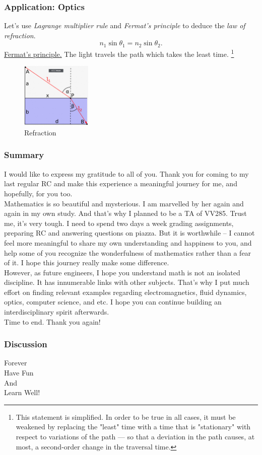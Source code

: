 \documentclass[11pt, t]{beamer}
\begin{document}
\begin{frame}
    \frametitle{Application: Optics}
    Let's use \textit{Lagrange multiplier rule} and \textit{Fermat's principle} to deduce the \textit{law of refraction}.
    $$n_1\sin\theta_1=n_2\sin\theta_2.$$
    \href{https://en.wikipedia.org/wiki/Fermat\%27s_principle}{Fermat's principle.} The light travels the path which takes the least time. \footnote[frame]{This statement is simplified. In order to be true in all cases, it must be weakened by replacing the "least" time with a time that is "stationary" with respect to variations of the path — so that a deviation in the path causes, at most, a second-order change in the traversal time.}
    \begin{figure}[H]
        \centering
        \includegraphics[width=0.3\textwidth]{Figures/2020-07-29-16-52-32.png}
        \caption{Refraction}
    \end{figure}
\end{frame}

\begin{frame}
    \frametitle{Summary}

    I would like to express my gratitude to all of you. Thank you for coming to my last regular RC and make this experience a meaningful journey for me, and hopefully, for you too.\\[8pt]
    Mathematics is so beautiful and mysterious. I am marvelled by her again and again in my own study. And that's why I planned to be a TA of VV285. Trust me, it's very tough. I need to spend two days a week grading assignments, preparing RC and answering questions on piazza. But it is worthwhile -- I cannot feel more meaningful to share my own understanding and happiness to you, and help some of you recognize the wonderfulness of mathematics rather than a fear of it. I hope this journey really make some difference.
    \\[8pt]
    However, as future engineers, I hope you understand math is not an isolated discipline. It has innumerable links with other subjects. That's why I put much effort on finding relevant examples regarding electromagnetics, fluid dynamics, optics, computer science, and etc. I hope you can continue building an interdisciplinary spirit afterwards.
    \\[8pt]
    Time to end. Thank you again!
\end{frame}

\begin{frame}
    \frametitle{Discussion}
    \vspace{1cm}
    \begin{center}
        \LARGE
        Forever\\
        Have Fun\\
        And\\
        Learn Well!
    \end{center}
\end{frame}
\end{document}
